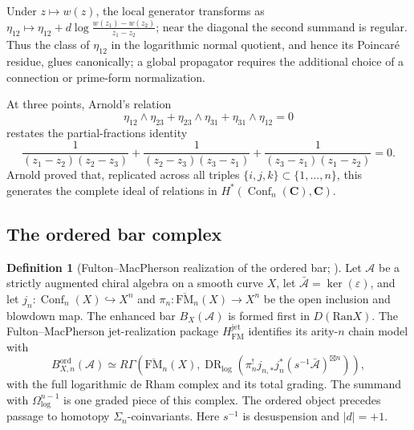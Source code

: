\documentclass[11pt]{article}
\theoremstyle{plain}
\theoremstyle{definition}
\newtheorem{definition}[theorem]{Definition}
\theoremstyle{remark}
\newcommand{\Ran}{\mathrm{Ran}}
\newcommand{\FM}{\mathrm{FM}}
\newcommand{\cA}{\mathcal{A}}
\newcommand{\Abar}{\bar{\cA}}
\DeclareMathOperator{\Conf}{Conf}
\begin{document}
Under $z \mapsto w(z)$, the local generator transforms as
$\eta_{12} \mapsto \eta_{12}
+ d\log\frac{w(z_1) - w(z_2)}{z_1 - z_2}$; near the diagonal
the second summand is regular.  Thus the class of $\eta_{12}$ in the
logarithmic normal quotient, and hence its Poincar\'e residue, glues
canonically; a global propagator requires the additional choice of a
connection or prime-form normalization.

At three points, Arnold's relation \cite{Arnold69}
\[
\eta_{12} \wedge \eta_{23}
+ \eta_{23} \wedge \eta_{31}
+ \eta_{31} \wedge \eta_{12}
= 0
\]
restates the partial-fractions identity
\[
\frac{1}{(z_1 - z_2)(z_2 - z_3)}
+ \frac{1}{(z_2 - z_3)(z_3 - z_1)}
+ \frac{1}{(z_3 - z_1)(z_1 - z_2)}
= 0.
\]
Arnold proved that, replicated across all triples
$\{i,j,k\} \subset \{1, \ldots, n\}$, this generates the
complete ideal of relations in
$H^*(\Conf_n(\mathbf{C}), \mathbf{C})$.

\subsection{The ordered bar complex}

\begin{definition}[Fulton--MacPherson realization of the ordered bar;
\ClaimStatusConditional]\label{def:ordered-bar}
Let $\cA$ be a strictly augmented chiral algebra on a smooth curve
$X$, let $\Abar=\ker(\varepsilon)$, and let
$j_n\colon\Conf_n(X)\hookrightarrow X^n$ and
$\pi_n\colon\overline{\FM}_n(X)\to X^n$ be the open inclusion and
blowdown map.  The enhanced bar $B_X(\cA)$ is formed first in
$D(\Ran X)$.  The Fulton--MacPherson jet-realization package
$H_{\mathrm{FM}}^{\mathrm{jet}}$ identifies its arity-$n$ chain model
with
\begin{equation}\label{eq:bar-full}
 B^{\mathrm{ord}}_{X,n}(\cA)
 \simeq
 R\Gamma\!\left(
  \overline{\FM}_n(X),
  \operatorname{DR}_{\log}\!\left(
   \pi_n^!j_{n,*}j_n^*(s^{-1}\Abar)^{\boxtimes n}
  \right)
 \right),
\end{equation}
with the full logarithmic de Rham complex and its total grading.  The
summand with $\Omega^{n-1}_{\log}$ is one graded piece of this complex.
The ordered object precedes passage to homotopy
$\Sigma_n$-coinvariants.  Here $s^{-1}$ is desuspension and
$|d|=+1$.
\end{definition}
\end{document}
